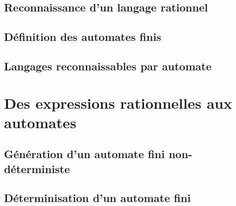 \documentclass[9pt, handout]{beamer}
\begin{document}
\subsection{Reconnaissance d'un langage rationnel}





 
\subsection{Définition des automates finis}






 
\subsection{Langages reconnaissables par automate}







 
\section{Des expressions rationnelles aux automates}
 
\subsection{Génération d'un automate fini non-déterministe}






 
\subsection{Déterminisation d'un automate fini}






 
\end{document}
